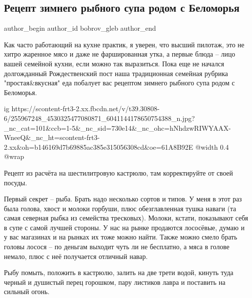  
 
 
 
 
 
\subsection{Рецепт зимнего рыбного супа родом с Беломорья}
\label{sec:13_11_2021.fb.bobrov_gleb.1.recept_sup_belomorje}
 
\ifcmt
 author_begin
   author_id bobrov_gleb
 author_end
\fi

Как часто работающий на кухне практик, я уверен, что высший пилотаж, это не
хитро жаренное мясо и даже не фаршированная утка, а первые блюда – лицо вашей
семейной кухни, если можно так выразиться. Пока еще не начался долгожданный
Рождественский пост наша традиционная семейная рубрика "простая\&вкусная" еда
побалует вас рецептом зимнего рыбного супа родом с Беломорья. 

\ifcmt
  ig https://scontent-frt3-2.xx.fbcdn.net/v/t39.30808-6/255967248_4530325477080871_6041144178650754388_n.jpg?_nc_cat=101&ccb=1-5&_nc_sid=730e14&_nc_ohc=hNhdzwRIWYAAX-WneeQ&_nc_ht=scontent-frt3-2.xx&oh=b146169d7b69885ac385e315056308cd&oe=61A8B92E
  @width 0.4
  @wrap 
\fi

Рецепт из расчёта на шестилитровую кастрюлю, там корректируйте от своей посуды. 

Первый секрет – рыба. Брать надо несколько сортов и типов. У меня в этот раз
была голова, хвост и молоки горбуши, плюс обезглавленная тушка наваги (та самая
северная рыбка из семейства тресковых). Молоки, кстати, показывают себя в супе
с самой лучшей стороны. У нас на рынке продаются лососёвые, думаю и у вас
магазинах и на рынках их тоже можно найти. Также можно смело брать головы
лосося – по деньгам выходит чуть ли не бесплатно, а мяса в голове немало, плюс
с неё получается отличный навар. 

Рыбу помыть, положить в кастрюлю, залить на две трети водой, кинуть туда черный
и душистый перец горошком, пару листиков лавра и поставить на сильный огонь. 

